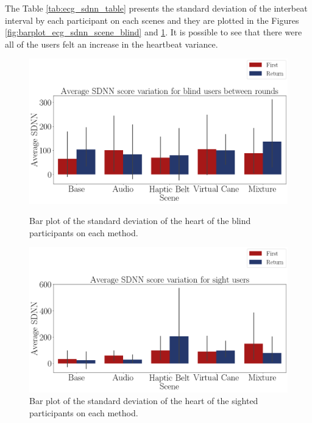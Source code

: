The Table \ref{tab:ecg_sdnn_table} presents the standard deviation of the interbeat interval by each participant on each scenes and they are plotted in the Figures \ref{fig:barplot_ecg_sdnn_scene_blind} and \ref{fig:barplot_ecg_sdnn_scene_sight}. It is possible to see that there were all of the users felt an increase in the heartbeat variance.



\begin{figure}[!htb]
    \centering
    \begin{minipage}{\textwidth}
        \centering
        \includegraphics[width = 0.8\linewidth]{Resultados/ECG/Figuras/png/barplot_ecg_sdnn_scene_blind.png}
        \caption{Bar plot of the standard deviation of the heart of the blind participants on each method.}
        \label{fig:barplot_ecg_sdnn_scene_blind}
    \end{minipage}
    \begin{minipage}{\textwidth}
        \centering
        \includegraphics[width = 0.8\linewidth]{Resultados/ECG/Figuras/png/barplot_ecg_sdnn_scene_sight.png}
        \caption{Bar plot of the standard deviation of the heart of the sighted participants on each method.}
        \label{fig:barplot_ecg_sdnn_scene_sight}
    \end{minipage}
\end{figure}

